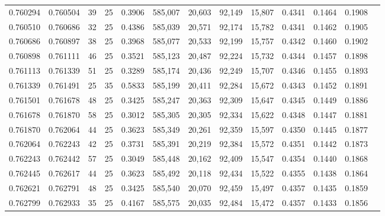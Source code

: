 \begin{tabular}{rrrrrrrrrrrrr}
0.760294 & 0.760504 &    39 &  25 &                                     0.3906 & 585,007 &  20,603 &  92,149 &  15,807 & 0.4341 & 0.1464 & 0.1908 \\
0.760510 & 0.760686 &    32 &  25 &                                     0.4386 & 585,039 &  20,571 &  92,174 &  15,782 & 0.4341 & 0.1462 & 0.1905 \\
0.760686 & 0.760897 &    38 &  25 &                                     0.3968 & 585,077 &  20,533 &  92,199 &  15,757 & 0.4342 & 0.1460 & 0.1902 \\
0.760898 & 0.761111 &    46 &  25 &                                     0.3521 & 585,123 &  20,487 &  92,224 &  15,732 & 0.4344 & 0.1457 & 0.1898 \\
0.761113 & 0.761339 &    51 &  25 &                                     0.3289 & 585,174 &  20,436 &  92,249 &  15,707 & 0.4346 & 0.1455 & 0.1893 \\
0.761339 & 0.761491 &    25 &  35 &                                     0.5833 & 585,199 &  20,411 &  92,284 &  15,672 & 0.4343 & 0.1452 & 0.1891 \\
0.761501 & 0.761678 &    48 &  25 &                                     0.3425 & 585,247 &  20,363 &  92,309 &  15,647 & 0.4345 & 0.1449 & 0.1886 \\
0.761678 & 0.761870 &    58 &  25 &                                     0.3012 & 585,305 &  20,305 &  92,334 &  15,622 & 0.4348 & 0.1447 & 0.1881 \\
0.761870 & 0.762064 &    44 &  25 &                                     0.3623 & 585,349 &  20,261 &  92,359 &  15,597 & 0.4350 & 0.1445 & 0.1877 \\
0.762064 & 0.762243 &    42 &  25 &                                     0.3731 & 585,391 &  20,219 &  92,384 &  15,572 & 0.4351 & 0.1442 & 0.1873 \\
0.762243 & 0.762442 &    57 &  25 &                                     0.3049 & 585,448 &  20,162 &  92,409 &  15,547 & 0.4354 & 0.1440 & 0.1868 \\
0.762445 & 0.762617 &    44 &  25 &                                     0.3623 & 585,492 &  20,118 &  92,434 &  15,522 & 0.4355 & 0.1438 & 0.1864 \\
0.762621 & 0.762791 &    48 &  25 &                                     0.3425 & 585,540 &  20,070 &  92,459 &  15,497 & 0.4357 & 0.1435 & 0.1859 \\
0.762799 & 0.762933 &    35 &  25 &                                     0.4167 & 585,575 &  20,035 &  92,484 &  15,472 & 0.4357 & 0.1433 & 0.1856 \\

\end{tabular}

